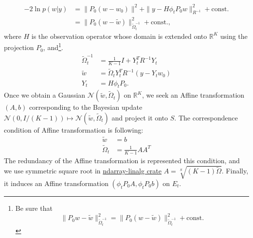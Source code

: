 \documentclass{article}
\newcommand{\Normal}{\mathcal{N}}
\newcommand{\Real}{\mathbb{R}}
\begin{document}
\begin{align}
  -2 \ln p(w|y) &= \| P_0(w-w_0) \|^2 + \| y - H \phi_t P_0 w \|_{R^{-1}}^2  + \text{const.}\\
                &= \| P_0(w-\tilde{w}) \|_{\tilde\Omega^{-1}_t}^2 + \text{const.},
\end{align}
where $H$ is the observation operator whose domain is extended onto $\Real^K$ using the projection $P_0$, and\footnote{Be sure that
  \begin{equation}
    \| P_0 w - \tilde w \|_{\tilde\Omega_t^{-1}}^2 
    = \| P_0 (w - \tilde w) \|_{\tilde\Omega_t^{-1}}^2  + \text{const.}
  \end{equation}
}.
\begin{align}
  \tilde\Omega_t^{-1} &= \frac{1}{K-1} I + Y_t^T R^{-1} Y_t \\
  \tilde{w} &= \tilde\Omega_t Y_t^T R^{-1} (y - Y_t w_0) \\
  Y_t &= H\phi_t P_0.
\end{align}
Once we obtain a Gaussian $\Normal(\tilde{w}, \tilde\Omega_t)$ on $\Real^K$,
we seek an Affine transformation $(A, b)$ corresponding to the Bayesian update
$\Normal(0, I/(K-1)) \mapsto \Normal(\tilde{w}, \tilde\Omega_t)$ and project it onto $S$.
The correspondence condition of Affine transformation is following:
\begin{align}
  \tilde{w}  &= b\\
  \tilde\Omega_t &= \frac{1}{K-1} A A^T
\end{align}
The redundancy of the Affine transformation is represented this condition,
and we use symmetric square root in \href{https://docs.rs/ndarray-linalg/0.7.1/ndarray_linalg/eigh/trait.SymmetricSqrt.html}{ndarray-linalg crate} $A = \sqrt[S]{(K-1) \tilde\Omega}$.
Finally, it induces an Affine transformation $(\phi_t P_0 A, \phi_t P_0 b)$ on $E_t$.
\end{document}
